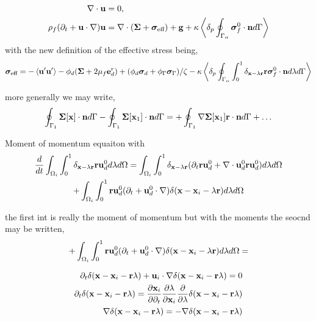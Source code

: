 \documentclass[12pt]{My_preprint}
\begin{document}
\begin{align}
    \div \textbf{u} &= 0, \\
    \rho_f (\pddt + \textbf{u} \cdot \grad) \textbf{u}
    &= 
    \div (\bm\Sigma
    + \bm\sigma_\text{eff})
    + \textbf{g}
    + \kappa \pSavg{\bm\sigma_f^0  \cdot \textbf{n}}
\end{align}
with the new definition of the effective stress being, 
\begin{multline}
    \bm\sigma_\text{eff}
    = -\avg{\textbf{u}'\textbf{u}'}
    - \phi_d (\bm\Sigma + 2\mu_f \textbf{e}_d^r)
    + (\phi_d \bm\sigma_d 
    + \phi_\Gamma \bm\sigma_\Gamma) /\zeta 
    - \kappa \pSMavg{\textbf{r}\bm\sigma_f^0  \cdot \textbf{n}}
    \\
\end{multline}

more generally we may write, 
\begin{equation}
    \intS[1]{
    \bm\Sigma[\textbf{x}]\cdot \textbf{n}
    }
    - \intS[1]{
    \bm\Sigma[\textbf{x}_1]\cdot \textbf{n}
    }
    = 
    + 
    \intS[1]{
    \grad \bm\Sigma[\textbf{x}_1] \textbf{r}\cdot \textbf{n}
    }
    + \ldots
\end{equation}

Moment of momentum equaiton with 
\begin{multline}
    \ddt \intO[i]{\intL{\textbf{ru}_d^0}}
    = \intO[i]{\intL{
        (\pddt \textbf{ru}_d^0
        + \div \textbf{u}_d^0\textbf{ru}_d^0)
    }}\\
    + \intO[i]{\int_0^1
        \textbf{ru}_d^0(\pddt 
        +  \textbf{u}_d^0 \cdot \grad)
        \delta(\textbf{x} - \textbf{x}_i - \lambda\textbf{r})
    d\lambda}
\end{multline}

the first int is really the moment of momentum but with the moments the seocnd may be written, 
\begin{equation}
    + \intO[i]{\int_0^1
    \textbf{ru}_d^0(\pddt 
    +  \textbf{u}_d^0 \cdot \grad)
    \delta(\textbf{x} - \textbf{x}_i - \lambda\textbf{r})
d\lambda}
=
\end{equation}

\begin{align}
    \pddt \delta(\textbf{x}-\textbf{x}_i - \textbf{r}\lambda)
    + \textbf{u}_i \cdot\grad \delta(\textbf{x}-\textbf{x}_i - \textbf{r}\lambda)
    = 0\\
    \pddt \delta(\textbf{x}-\textbf{x}_i - \textbf{r}\lambda)
    =
    \frac{\partial \textbf{x}_i}{\partial \pddt}
    \frac{\partial \lambda}{\partial \textbf{x}_i}
    \frac{\partial}{\partial\lambda } 
    \delta(\textbf{x}-\textbf{x}_i - \textbf{r}\lambda)\\
    \grad \delta(\textbf{x}-\textbf{x}_i - \textbf{r}\lambda)
    = 
    -  \grad\delta(\textbf{x}-\textbf{x}_i - \textbf{r}\lambda)
\end{align}
\end{document}
